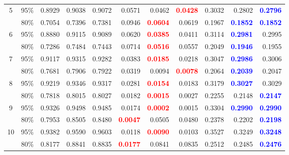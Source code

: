 \begin{longtable}{ccrrrrrrrrr}
\cmidrule(lr){1-11}
5 & 95\% & 0.8929 & 0.9038 & 0.9072 & 0.0571 & 0.0462 & \textcolor{red}{\textbf{0.0428}} & 0.3032 & 0.2802 & \textcolor{blue}{\textbf{0.2796}} \\
 & 80\% & 0.7054 & 0.7396 & 0.7381 & 0.0946 & \textcolor{red}{\textbf{0.0604}} & 0.0619 & 0.1967 & \textcolor{blue}{\textbf{0.1852}} & \textcolor{blue}{\textbf{0.1852}} \\
\cmidrule(lr){1-11}
6 & 95\% & 0.8880 & 0.9115 & 0.9089 & 0.0620 & \textcolor{red}{\textbf{0.0385}} & 0.0411 & 0.3114 & \textcolor{blue}{\textbf{0.2981}} & 0.2995 \\
 & 80\% & 0.7286 & 0.7484 & 0.7443 & 0.0714 & \textcolor{red}{\textbf{0.0516}} & 0.0557 & 0.2049 & \textcolor{blue}{\textbf{0.1946}} & 0.1955 \\
\cmidrule(lr){1-11}
7 & 95\% & 0.9117 & 0.9315 & 0.9282 & 0.0383 & \textcolor{red}{\textbf{0.0185}} & 0.0218 & 0.3047 & \textcolor{blue}{\textbf{0.2986}} & 0.3006 \\
 & 80\% & 0.7681 & 0.7906 & 0.7922 & 0.0319 & 0.0094 & \textcolor{red}{\textbf{0.0078}} & 0.2064 & \textcolor{blue}{\textbf{0.2039}} & 0.2047 \\
\cmidrule(lr){1-11}
8 & 95\% & 0.9219 & 0.9346 & 0.9317 & 0.0281 & \textcolor{red}{\textbf{0.0154}} & 0.0183 & 0.3179 & \textcolor{blue}{\textbf{0.3027}} & 0.3029 \\
 & 80\% & 0.7818 & 0.8015 & 0.8027 & 0.0182 & \textcolor{red}{\textbf{0.0015}} & 0.0027 & 0.2255 & 0.2148 & \textcolor{blue}{\textbf{0.2147}} \\
\cmidrule(lr){1-11}
9 & 95\% & 0.9326 & 0.9498 & 0.9485 & 0.0174 & \textcolor{red}{\textbf{0.0002}} & 0.0015 & 0.3304 & \textcolor{blue}{\textbf{0.2990}} & \textcolor{blue}{\textbf{0.2990}} \\
 & 80\% & 0.7953 & 0.8505 & 0.8480 & \textcolor{red}{\textbf{0.0047}} & 0.0505 & 0.0480 & 0.2378 & 0.2202 & \textcolor{blue}{\textbf{0.2198}} \\
\cmidrule(lr){1-11}
10 & 95\% & 0.9382 & 0.9590 & 0.9603 & 0.0118 & \textcolor{red}{\textbf{0.0090}} & 0.0103 & 0.3527 & 0.3249 & \textcolor{blue}{\textbf{0.3248}} \\
 & 80\% & 0.8177 & 0.8841 & 0.8835 & \textcolor{red}{\textbf{0.0177}} & 0.0841 & 0.0835 & 0.2512 & 0.2485 & \textcolor{blue}{\textbf{0.2476}} \\
\bottomrule
\end{longtable}
\endgroup
\endgroup
